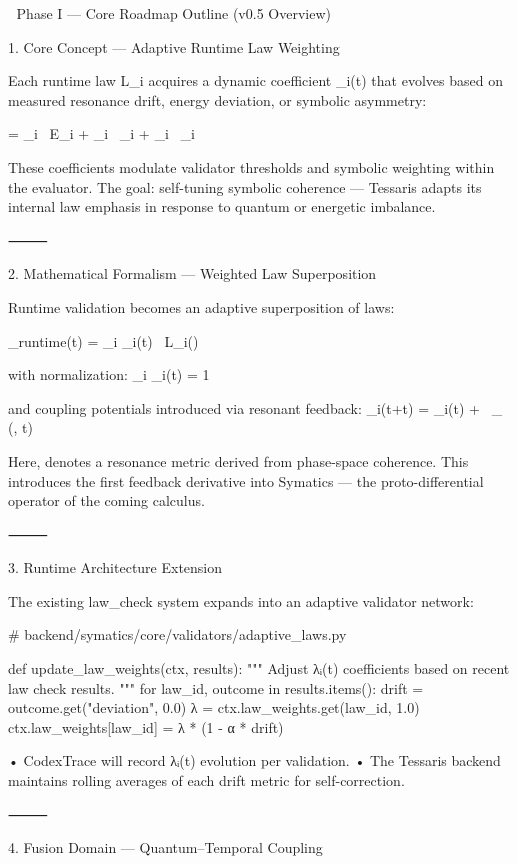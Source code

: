 

🧭 Phase I — Core Roadmap Outline (v0.5 Overview)

1. Core Concept — Adaptive Runtime Law Weighting

Each runtime law L_i acquires a dynamic coefficient \lambda_i(t) that evolves based on measured resonance drift, energy deviation, or symbolic asymmetry:

 = \alpha_i \, \Delta E_i + \beta_i \, \Delta \varphi_i + \gamma_i \, \Delta \psi_i

These coefficients modulate validator thresholds and symbolic weighting within the evaluator.
The goal: self-tuning symbolic coherence — Tessaris adapts its internal law emphasis in response to quantum or energetic imbalance.

⸻

2. Mathematical Formalism — Weighted Law Superposition

Runtime validation becomes an adaptive superposition of laws:

_{runtime}(t) = \sum_i \lambda_i(t) \, L_i(\psi)

with normalization:
\sum_i \lambda_i(t) = 1

and coupling potentials introduced via resonant feedback:
\lambda_i(t+\Delta t) = \lambda_i(t) + \eta \, \nabla_\psi \, (\psi, t)

Here,  denotes a resonance metric derived from phase-space coherence.
This introduces the first feedback derivative into Symatics — the proto-differential operator of the coming calculus.

⸻

3. Runtime Architecture Extension


The existing law_check system expands into an adaptive validator network:


# backend/symatics/core/validators/adaptive_laws.py

def update_law_weights(ctx, results):
    """
    Adjust λᵢ(t) coefficients based on recent law check results.
    """
    for law_id, outcome in results.items():
        drift = outcome.get("deviation", 0.0)
        λ = ctx.law_weights.get(law_id, 1.0)
        ctx.law_weights[law_id] = λ * (1 - α * drift)


	•	CodexTrace will record λᵢ(t) evolution per validation.
	•	The Tessaris backend maintains rolling averages of each drift metric for self-correction.

⸻

4. Fusion Domain — Quantum–Temporal Coupling

